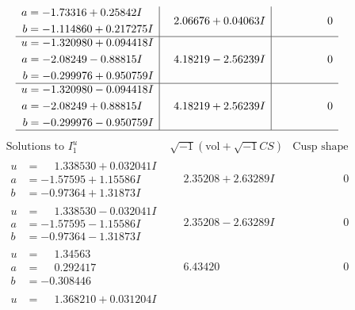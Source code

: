 \documentclass[1p]{elsarticle_modified}
\theoremstyle{definition}
\newcommand{\I}{\sqrt{-1}}
\begin{document}
$$\begin{array}{c|c|c}
\begin{aligned}
a &= -1.73316 + 0.25842 I \\
b &= -1.114860 + 0.217275 I\end{aligned}
 & \phantom{-}2.06676 + 0.04063 I & \phantom{-0.000000 } 0 \\ \hline\begin{aligned}
u &= -1.320980 + 0.094418 I \\
a &= -2.08249 - 0.88815 I \\
b &= -0.299976 + 0.950759 I\end{aligned}
 & \phantom{-}4.18219 - 2.56239 I & \phantom{-0.000000 } 0 \\ \hline\begin{aligned}
u &= -1.320980 - 0.094418 I \\
a &= -2.08249 + 0.88815 I \\
b &= -0.299976 - 0.950759 I\end{aligned}
 & \phantom{-}4.18219 + 2.56239 I & \phantom{-0.000000 } 0\\
 \hline 
 \end{array}$$\newpage$$\begin{array}{c|c|c}  
\text{Solutions to }I^u_{1}& \I (\text{vol} + \sqrt{-1}CS) & \text{Cusp shape}\\
 \hline 
\begin{aligned}
u &= \phantom{-}1.338530 + 0.032041 I \\
a &= -1.57595 + 1.15586 I \\
b &= -0.97364 + 1.31873 I\end{aligned}
 & \phantom{-}2.35208 + 2.63289 I & \phantom{-0.000000 } 0 \\ \hline\begin{aligned}
u &= \phantom{-}1.338530 - 0.032041 I \\
a &= -1.57595 - 1.15586 I \\
b &= -0.97364 - 1.31873 I\end{aligned}
 & \phantom{-}2.35208 - 2.63289 I & \phantom{-0.000000 } 0 \\ \hline\begin{aligned}
u &= \phantom{-}1.34563\phantom{ +0.000000I} \\
a &= \phantom{-}0.292417\phantom{ +0.000000I} \\
b &= -0.308446\phantom{ +0.000000I}\end{aligned}
 & \phantom{-}6.43420\phantom{ +0.000000I} & \phantom{-0.000000 } 0 \\ \hline\begin{aligned}
u &= \phantom{-}1.368210 + 0.031204 I \\

\end{aligned}
\end{array}$$
\end{document}

